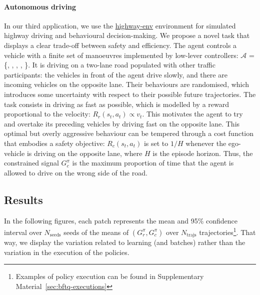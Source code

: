 \documentclass{article}
\begin{document}
\paragraph{Autonomous driving}
In our third application, we use the \href{https://github.com/eleurent/highway-env}{highway-env} environment \citep{Leurent2018} for simulated highway driving and behavioural decision-making.
We propose a novel task that displays a clear trade-off between safety and efficiency. The agent controls a vehicle with a finite set of manoeuvres implemented by low-lever controllers: $\mathcal{A}$ = \{, , , , \}. It is driving on a two-lane road populated with other traffic participants: the vehicles in front of the agent drive slowly, and there are incoming vehicles on the opposite lane. Their behaviours are randomised, which introduces some uncertainty with respect to their possible future trajectories.
The task consists in driving as fast as possible, which is modelled by a reward proportional to the velocity: $R_r(s_t, a_t) \propto v_t$. This motivates the agent to try and overtake its preceding vehicles by driving fast on the opposite lane. This optimal but overly aggressive behaviour can be tempered through a cost function that embodies a safety objective: $R_c(s_t, a_t)$ is set to $1/H$ whenever the ego-vehicle is driving on the opposite lane, where $H$ is the episode horizon. Thus, the constrained signal $G_c^\pi$ is the maximum proportion of time that the agent is allowed to drive on the wrong side of the road.

\subsection{Results}

In the following figures, each patch represents the mean and 95\% confidence interval over $N_{\text{seeds}}$ seeds of the means of $(G_r^\pi,G_c^\pi)$ over $N_\text{trajs}$ trajectories\footnote{Examples of policy execution can be found in Supplementary Material~\ref{sec:bftq-executions}}. That way, we display the variation related to learning (and batches) rather than the variation in the execution of the policies.
\end{document}

